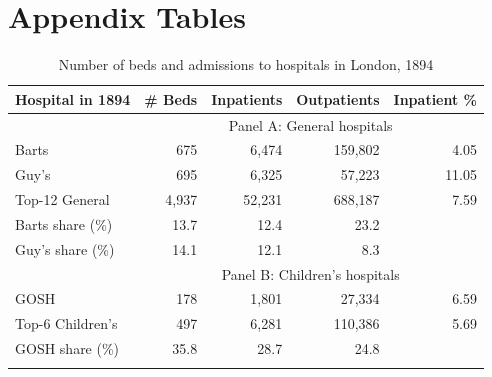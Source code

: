 \documentclass[12pt,english]{article}
\begin{document}

\newpage
\FloatBarrier
\section{Appendix Tables\label{sec:appendix-tables}}
\setcounter{table}{0}

\begin{table}[ht]\centering
	\begin{adjustbox}{width=.75\textwidth}
	\centering
	\begin{threeparttable}
		\caption{Number of beds and admissions to hospitals in London, 1894
		\label{tab:TabHospAdmitTotal}}
		\vspace{.25ex}
		\textsymbols
		\begin{tabular}{l*{4}{r}}
        \toprule
        \multicolumn{1}{c}{Hospital in 1894} & \multicolumn{1}{c}{\# Beds} & \multicolumn{1}{c}{Inpatients} & \multicolumn{1}{c}{Outpatients} & \multicolumn{1}{c}{Inpatient \%} \\
        \midrule
        &\multicolumn{4}{c}{Panel A: General hospitals} \\
        Barts & 675 & 6,474 & 159,802 & 4.05  \\         
        Guy's & 695 & 6,325 & 57,223 & 11.05 \\ 
        Top-12 General & 4,937 & 52,231 & 688,187 & 7.59 \\   
        \midrule
        Barts share (\%) & 13.7 & 12.4 & 23.2 & \\ 
        Guy's share (\%) & 14.1 & 12.1 & 8.3 & \\
        \midrule
        &\multicolumn{4}{c}{Panel B: Children's hospitals} \\
        GOSH & 178 & 1,801 & 27,334 & 6.59  \\
        Top-6 Children's & 497 & 6,281 & 110,386 & 5.69 \\
        \midrule
        GOSH share (\%) & 35.8 & 28.7 & 24.8 & \\
        \bottomrule
        \addlinespace[.75ex]
        \end{tabular}
		 
	\end{threeparttable}
	\end{adjustbox}
\end{table}
\end{document}
